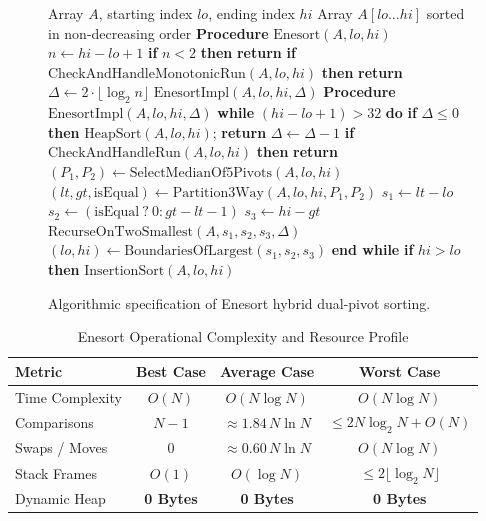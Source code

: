 \documentclass[journal]{IEEEtran}
\begin{document}
\begin{figure}[!t]
\begin{algorithmic}[1]
\REQUIRE Array $A$, starting index $lo$, ending index $hi$
\ENSURE Array $A[lo \dots hi]$ sorted in non-decreasing order
\STATE \textbf{Procedure} $\text{Enesort}(A, lo, hi)$
\STATE \quad $n \leftarrow hi - lo + 1$
\STATE \quad \textbf{if} $n < 2$ \textbf{then} \textbf{return}
\STATE \quad \textbf{if} $\text{CheckAndHandleMonotonicRun}(A, lo, hi)$ \textbf{then} \textbf{return}
\STATE \quad $\Delta \leftarrow 2 \cdot \lfloor \log_2 n \rfloor$
\STATE \quad $\text{EnesortImpl}(A, lo, hi, \Delta)$
\STATE
\STATE \textbf{Procedure} $\text{EnesortImpl}(A, lo, hi, \Delta)$
\STATE \quad \textbf{while} $(hi - lo + 1) > 32$ \textbf{do}
\STATE \quad \quad \textbf{if} $\Delta \le 0$ \textbf{then}
\STATE \quad \quad \quad $\text{HeapSort}(A, lo, hi)$; \textbf{return}
\STATE \quad \quad $\Delta \leftarrow \Delta - 1$
\STATE \quad \quad \textbf{if} $\text{CheckAndHandleRun}(A, lo, hi)$ \textbf{then} \textbf{return}
\STATE \quad \quad $(P_1, P_2) \leftarrow \text{SelectMedianOf5Pivots}(A, lo, hi)$
\STATE \quad \quad $(lt, gt, \text{isEqual}) \leftarrow \text{Partition3Way}(A, lo, hi, P_1, P_2)$
\STATE \quad \quad $s_1 \leftarrow lt - lo$
\STATE \quad \quad $s_2 \leftarrow (\text{isEqual} \ ? \ 0 : gt - lt - 1)$
\STATE \quad \quad $s_3 \leftarrow hi - gt$
\STATE \quad \quad $\text{RecurseOnTwoSmallest}(A, s_1, s_2, s_3, \Delta)$
\STATE \quad \quad $(lo, hi) \leftarrow \text{BoundariesOfLargest}(s_1, s_2, s_3)$
\STATE \quad \textbf{end while}
\STATE \quad \textbf{if} $hi > lo$ \textbf{then} $\text{InsertionSort}(A, lo, hi)$
\end{algorithmic}
\caption{Algorithmic specification of Enesort hybrid dual-pivot sorting.}
\label{alg:enesort}
\end{figure}

\begin{table}[h]
\centering
\caption{Enesort Operational Complexity and Resource Profile}
\label{tab:enesort_profile}
\begin{tabular}{lccc}
\toprule
Metric & Best Case & Average Case & Worst Case \\
\midrule
Time Complexity & $O(N)$ & $O(N \log N)$ & $O(N \log N)$ \\
Comparisons & $N - 1$ & $\approx 1.84\, N \ln N$ & $\le 2 N \log_2 N + O(N)$ \\
Swaps / Moves & $0$ & $\approx 0.60\, N \ln N$ & $O(N \log N)$ \\
Stack Frames & $O(1)$ & $O(\log N)$ & $\le 2 \lfloor \log_2 N \rfloor$ \\
Dynamic Heap & \textbf{0 Bytes} & \textbf{0 Bytes} & \textbf{0 Bytes} \\
\bottomrule
\end{tabular}
\end{table}
\end{document}
